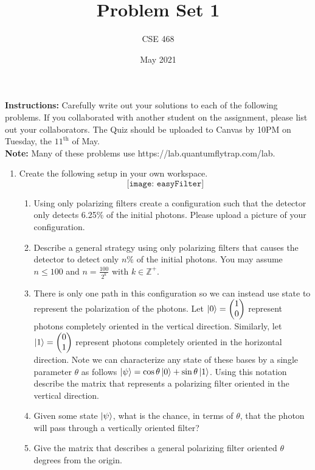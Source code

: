 \documentclass[12pt]{article}
\title{Problem Set 1}
\author{CSE 468}
\date{May 2021}
\begin{document}
\maketitle

\noindent \textbf{Instructions:} Carefully write out your solutions to each of the following problems. If you collaborated with another student on the assignment, please list out your collaborators. The Quiz should be uploaded to Canvas by 10PM on Tuesday, the $11^{\text{th}}$ of May. \\
\noindent \textbf{Note:} Many of these problems use https://lab.quantumflytrap.com/lab.

\begin{enumerate}[font=\bfseries]
    \item Create the following setup in your own workspace.\\
    \[\texttt{[image: easyFilter]}\]
    \begin{enumerate}
        \item Using only polarizing filters create a configuration such that the detector only detects 6.25$\%$ of the initial photons. Please upload a picture of your configuration.
        \item Describe a general strategy using only polarizing filters that causes the detector to detect only $n\%$ of the initial photons. You may assume $n \leq 100$ and $n = \frac{100}{2^k}$ with $k\in\mathbb{Z}^+$.
        \item There is only one path in this configuration so we can instead use state to represent the polarization of the photons. Let $\ket{0} = \begin{pmatrix}1 \\ 0 \end{pmatrix}$ represent photons completely oriented in the vertical direction. Similarly, let $\ket{1} = \begin{pmatrix}0 \\ 1 \end{pmatrix}$ represent photons completely oriented in the horizontal direction. Note we can characterize any state of these bases by a single parameter $\theta$ as follows $\ket{\psi} = \cos{\theta}\ket{0} + \sin{\theta}\ket{1}$. Using this notation describe the matrix that represents a polarizing filter oriented in the vertical direction.
        \item Given some state $\ket{\psi}$, what is the chance, in terms of $\theta$, that the photon will pass through a vertically oriented filter?
        \item Give the matrix that describes a general polarizing filter oriented $\theta$ degrees from the origin.

\end{enumerate}
\end{enumerate}
\end{document}
